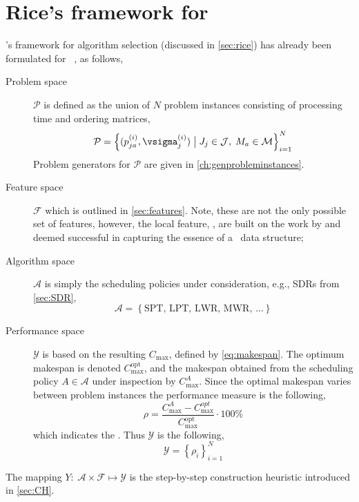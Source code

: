 \section{Rice's framework for \jsp}\label{sec:rice:jsp}
\citeauthor{Rice76}'s framework for algorithm selection (discussed in \cref{sec:rice}) has already been formulated for \jsp\ \citep[cf.][]{SmithMilesLion3,SmithMilesLion5,InRu12}, as follows, 
\begin{description} 
\item[Problem space] $\mathcal{P}$ is defined as the union of $N$ problem instances consisting of processing time and ordering matrices,
\begin{equation} 
\mathcal{P}=\left\{(p_{ja}^{(i)},\vsigma_j^{(i)})\;\big|\;J_j\in\mathcal{J},\;M_a\in\mathcal{M}\right\}_{i=1}^{N}
\end{equation}
Problem generators for $\mathcal{P}$ are given in \cref{ch:genprobleminstances}.
\item[Feature space] $\mathcal{F}$ which is outlined in \cref{sec:features}. Note, these are not the only possible set of features, however, the local feature, \phiLocalRelated, are built on the work by \cite{InRu11a,SmithMilesLion3} and deemed successful in capturing the essence of a \jsp\ data structure;
\item[Algorithm space] $\mathcal{A}$ is simply the scheduling policies under consideration, e.g., SDRs from \cref{sec:SDR},
\begin{equation}
\mathcal{A}=\left\{\text{SPT,~LPT,~LWR,~MWR,~}\dotsc\right\}
\end{equation} 
\item[Performance space] $\mathcal{Y}$ is based on the resulting $C_{\max}$, defined by \cref{eq:makespan}. The optimum makespan is denoted $C_{\max}^{\text{opt}}$, and the makespan obtained from the scheduling policy $A\in\mathcal{A}$ under inspection by $C_{\max}^{A}$. Since the optimal makespan varies between problem instances the performance measure is the following, 
\begin{equation}\label{eq:rho}
\rho=\frac{C_{\max}^{A}-C_{\max}^{opt}}{C_{\max}^{\text{opt}}}\cdot 100\%
\end{equation}
which indicates the \namerho. Thus $\mathcal{Y}$ is the following, 
\begin{equation}
\mathcal{Y}=\left\{\rho_i\right\}_{i=1}^{N}
\end{equation}
\end{description}
The mapping $Y:\;\mathcal{A}\times\mathcal{F} \mapsto \mathcal{Y}$ is the step-by-step construction heuristic introduced in \cref{sec:CH}.